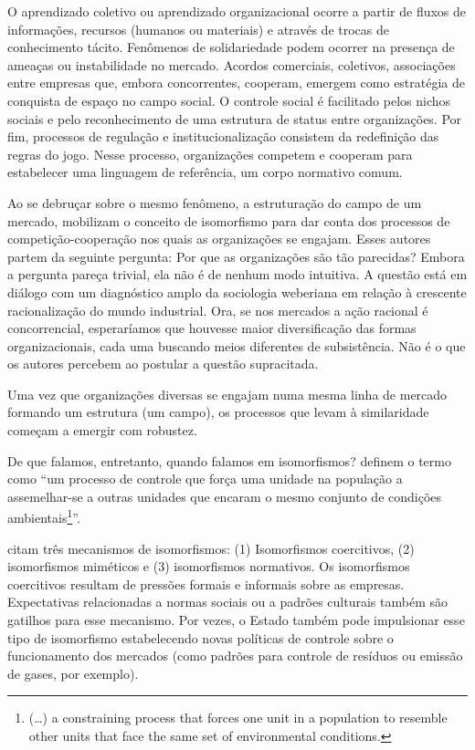 \documentclass[a4paper, 12pt, openright, oneside, german, french, english, brazil]{abntex2}
\begin{document}
	O aprendizado coletivo ou aprendizado organizacional ocorre a partir de fluxos de informações, recursos (humanos ou materiais) e através de trocas de conhecimento tácito. Fenômenos de solidariedade podem ocorrer na presença de ameaças ou instabilidade no mercado. Acordos comerciais, coletivos, associações entre empresas que, embora concorrentes, cooperam, emergem como estratégia de conquista de espaço no campo social. O controle social é facilitado pelos nichos sociais e pelo reconhecimento de uma estrutura de status entre organizações. Por fim, processos de regulação e institucionalização consistem da redefinição das regras do jogo. Nesse processo, organizações competem e cooperam para estabelecer uma linguagem de referência, um corpo normativo comum.

	Ao se debruçar sobre o mesmo fenômeno, a estruturação do campo de um mercado,  mobilizam o conceito de isomorfismo para dar conta dos processos de competição-cooperação nos quais as organizações se engajam. Esses autores partem da seguinte pergunta: Por que as organizações são tão parecidas? Embora a pergunta pareça trivial, ela não é de nenhum modo intuitiva. A questão está em diálogo com um diagnóstico amplo da sociologia weberiana em relação à crescente racionalização do mundo industrial. Ora, se nos mercados a ação racional é concorrencial, esperaríamos que houvesse maior diversificação das formas organizacionais, cada uma buscando meios diferentes de subsistência. Não é o que os autores percebem ao postular a questão supracitada. %

	Uma vez que organizações diversas se engajam numa mesma linha de mercado formando um estrutura (um campo), os processos que levam à similaridade começam a emergir com robustez.

	De que falamos, entretanto, quando falamos em isomorfismos?  definem o termo como ``um processo de controle que força uma unidade na população a assemelhar-se a outras unidades que encaram o mesmo conjunto de condições ambientais\footnote{(\dots) a constraining process that forces one unit in a population to resemble other units that face the same set of environmental conditions.}''.

	 citam três mecanismos de isomorfismos: (1) Isomorfismos coercitivos, (2) isomorfismos miméticos e (3) isomorfismos normativos. Os isomorfismos coercitivos resultam de pressões formais e informais sobre as empresas. Expectativas relacionadas a normas sociais ou a padrões culturais também são gatilhos para esse mecanismo. Por vezes, o Estado também pode impulsionar esse tipo de isomorfismo estabelecendo novas políticas de controle sobre o funcionamento dos mercados (como padrões para controle de resíduos ou emissão de gases, por exemplo).
\end{document}
